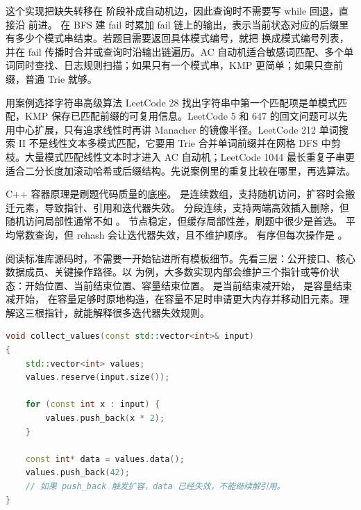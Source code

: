 这个实现把缺失转移在  阶段补成自动机边，因此查询时不需要写 while 回退，直接沿  前进。  在 BFS 建 fail 时累加 fail 链上的输出，表示当前状态对应的后缀里有多少个模式串结束。若题目需要返回具体模式编号，就把  换成模式编号列表，并在 fail 传播时合并或查询时沿输出链遍历。AC 自动机适合敏感词匹配、多个单词同时查找、日志规则扫描；如果只有一个模式串，KMP 更简单；如果只查前缀，普通 Trie 就够。

\begin{principlebox}{用案例选择字符串高级算法}
LeetCode 28 找出字符串中第一个匹配项是单模式匹配，KMP 保存已匹配前缀的可复用信息。LeetCode 5 和 647 的回文问题可以先用中心扩展，只有追求线性时再讲 Manacher 的镜像半径。LeetCode 212 单词搜索 II 不是线性文本多模式匹配，它要用 Trie 合并单词前缀并在网格 DFS 中剪枝。大量模式匹配线性文本时才进入 AC 自动机；LeetCode 1044 最长重复子串更适合二分长度加滚动哈希或后缀结构。先说案例里的重复比较在哪里，再选算法。
\end{principlebox}


C++ 容器原理是刷题代码质量的底座。  是连续数组，支持随机访问，扩容时会搬迁元素，导致指针、引用和迭代器失效。  分段连续，支持两端高效插入删除，但随机访问局部性通常不如 。  节点稳定，但缓存局部性差，刷题中很少是首选。  平均常数查询，但 rehash 会让迭代器失效，且不维护顺序。  有序但每次操作是 。

阅读标准库源码时，不需要一开始钻进所有模板细节。先看三层：公开接口、核心数据成员、关键操作路径。以  为例，大多数实现内部会维护三个指针或等价状态：开始位置、当前结束位置、容量结束位置。  是当前结束减开始， 是容量结束减开始， 在容量足够时原地构造，在容量不足时申请更大内存并移动旧元素。理解这三根指针，就能解释很多迭代器失效规则。

\begin{lstlisting}[language=C++,caption={vector 使用习惯：reserve、resize 和引用失效}]
void collect_values(const std::vector<int>& input)
{
    std::vector<int> values;
    values.reserve(input.size());

    for (const int x : input) {
        values.push_back(x * 2);
    }

    const int* data = values.data();
    values.push_back(42);
    // 如果 push_back 触发扩容，data 已经失效，不能继续解引用。
}
\end{lstlisting}

